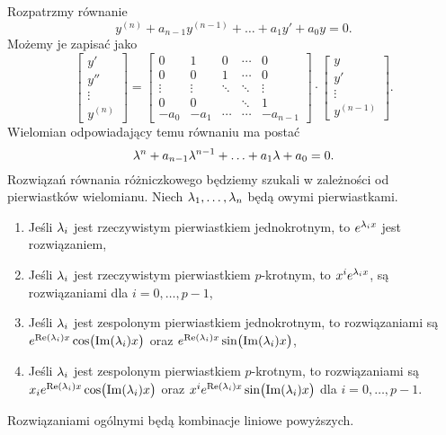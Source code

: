 %
Rozpatrzmy równanie
%
\begin{equation*}
  y^{(n)} + a_{n-1} y^{(n-1)} + \ldots + a_1 y' + a_0 y = 0.
\end{equation*}
%
Możemy je zapisać jako
%
\begin{equation*}
  \begin{bmatrix}
    y' \\
    y'' \\
    \vdots \\
    y^{(n)}
  \end{bmatrix}
  =
  \begin{bmatrix}
    0      & 1      & 0      & \cdots & 0        \\
    0      & 0      & 1      & \cdots & 0        \\
    \vdots & \vdots & \ddots & \ddots & \vdots   \\
    0      & 0      &        & \ddots & 1        \\
    -a_0   & -a_1   & \cdots & \cdots & -a_{n-1}
  \end{bmatrix}
  \cdot
  \begin{bmatrix}
    y \\
    y' \\
    \vdots \\
    y^{(n-1)}
  \end{bmatrix}.
\end{equation*}
%
Wielomian odpowiadający temu równaniu ma postać
%
\begin{equation*}
  \l^n + a_{n-1} \l^{n-1} + \ldots + a_1 \l + a_0 = 0.
\end{equation*}
%
Rozwiązań równania różniczkowego będziemy szukali w zależności od pierwiastków wielomianu. Niech 
$\l_1,\ldots,\l_n$ będą owymi pierwiastkami.
%
\begin{enumerate}
  \item Jeśli $\l_i$ jest rzeczywistym pierwiastkiem jednokrotnym, to $e^{\l_i x}$ jest rozwiązaniem,
  \item Jeśli $\l_i$ jest rzeczywistym pierwiastkiem $p$-krotnym, to $x^i e^{\l_i x}$, są rozwiązaniami dla $i = 0, 
  \ldots, p-1$,
  \item Jeśli $\l_i$ jest zespolonym pierwiastkiem jednokrotnym, to rozwiązaniami są $e^{\real(\l_i)x} \cos 
  \p[\big]{\imag(\l_i) x}$ oraz $e^{\real(\l_i)x} \sin \p[\big]{\imag(\l_i) x}$,
  \item Jeśli $\l_i$ jest zespolonym pierwiastkiem $p$-krotnym, to rozwiązaniami są $x_i e^{\real(\l_i)x} \cos 
  \p[\big]{\imag(\l_i) x}$ oraz $x^i e^{\real(\l_i)x} \sin \p[\big]{\imag(\l_i) x}$ dla $i = 0, \ldots, p-1$.
\end{enumerate}
%
Rozwiązaniami ogólnymi będą kombinacje liniowe powyższych.

